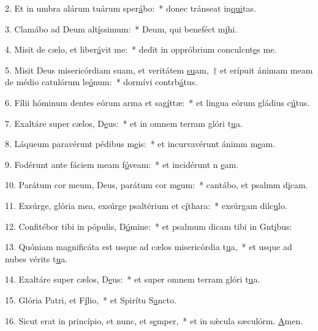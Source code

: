 2. Et in umbra alárum tuárum sper\uline{á}bo:~* donec tránseat in\uline{qui}tas.\par 
3. Clamábo ad Deum alt\uline{í}ssimum:~* Deum, qui beneféct m\uline{i}hi.\par 
4. Misit de cælo, et liber\uline{á}vit me:~* dedit in oppróbrium conculcnt\uline{e}s me.\par 
5. Misit Deus misericórdiam suam, et veritátem \uline{su}am,~† et erípuit ánimam meam de médio catulórum le\uline{ó}num:~* dormívi contrb\uline{á}tus.\par 
6. Fílii hóminum dentes eórum arma et sag\uline{í}ttæ:~* et lingua eórum gládius c\uline{ú}tus.\par 
7. Exaltáre super cælos, D\uline{e}us:~* et in omnem terram glóri t\uline{u}a.\par 
8. Láqueum paravérunt pédibus m\uline{e}is:~* et incurvavérunt ánimm m\uline{e}am.\par 
9. Fodérunt ante fáciem meam f\uline{ó}veam:~* et incidérunt n \uline{e}am.\par 
10. Parátum cor meum, Deus, parátum cor m\uline{e}um:~* cantábo, et psalmm d\uline{i}cam.\par 
11. Exsúrge, glória mea, exsúrge psaltérium et c\uline{í}thara:~* exsúrgam dilc\uline{u}lo.\par 
12. Confitébor tibi in pópulis, D\uline{ó}mine:~* et psalmum dicam tibi in Gnt\uline{i}bus:\par 
13. Quóniam magnificáta est usque ad cælos misericórdia t\uline{u}a,~* et usque ad nubes vérits t\uline{u}a.\par 
14. Exaltáre super cælos, D\uline{e}us:~* et super omnem terram glóri t\uline{u}a.\par 
15. Glória Patri, et F\uline{í}lio,~* et Spirítu S\uline{a}ncto.\par 
16. Sicut erat in princípio, et nunc, et s\uline{e}mper,~* et in sǽcula sæculórm. \uline{A}men.\par 

